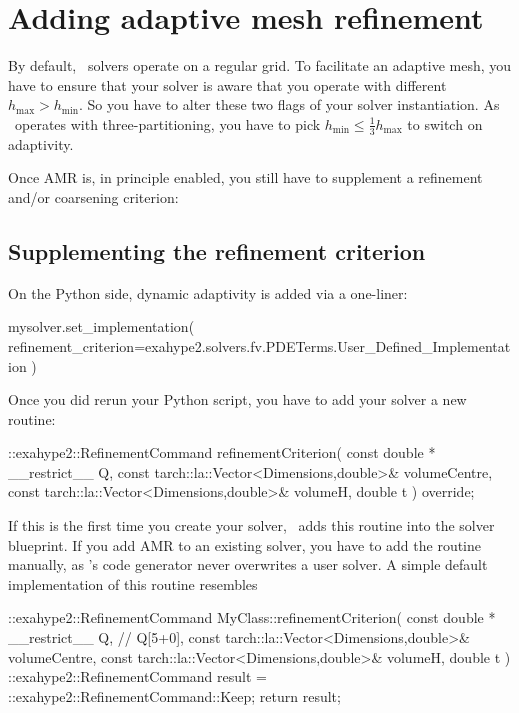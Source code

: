 \section{Adding adaptive mesh refinement}

By default, \ExaHyPE\ solvers operate on a regular grid.
To facilitate an adaptive mesh, you have to ensure that your solver is aware that you operate 
with different $h_{\text{max}}>h_{\text{min}}$. 
So you have to alter these two flags of your solver instantiation.
As \Peano\ operates with three-partitioning, you have to pick 
$h_{\text{min}} \leq \frac{1}{3} h_{\text{max}}$ to switch on adaptivity.

Once AMR is, in principle enabled, you still have to supplement a refinement and/or coarsening criterion:



\subsection{Supplementing the refinement criterion}

On the Python side, dynamic adaptivity is added via a one-liner:

\begin{code}
mysolver.set_implementation(
 refinement_criterion=exahype2.solvers.fv.PDETerms.User_Defined_Implementation 
)
\end{code}


\noindent
Once you did rerun your Python script, you have to add your solver a new
routine:

\begin{code}
::exahype2::RefinementCommand refinementCriterion(
  const double * __restrict__ Q,
  const tarch::la::Vector<Dimensions,double>&  volumeCentre,
  const tarch::la::Vector<Dimensions,double>&  volumeH,
  double                                       t
) override;
\end{code}


\noindent
If this is the first time you create your solver, \ExaHyPE\ adds this routine
into the solver blueprint.
If you add AMR to an existing solver, you have to add the routine manually, as
\ExaHyPE's code generator never overwrites a user solver.
A simple default implementation of this routine resembles

\begin{code}
::exahype2::RefinementCommand MyClass::refinementCriterion(
  const double * __restrict__ Q, // Q[5+0],
  const tarch::la::Vector<Dimensions,double>&  volumeCentre,
  const tarch::la::Vector<Dimensions,double>&  volumeH,
  double                                       t
) {
  ::exahype2::RefinementCommand result = ::exahype2::RefinementCommand::Keep;
  return result;
}
\end{code}


